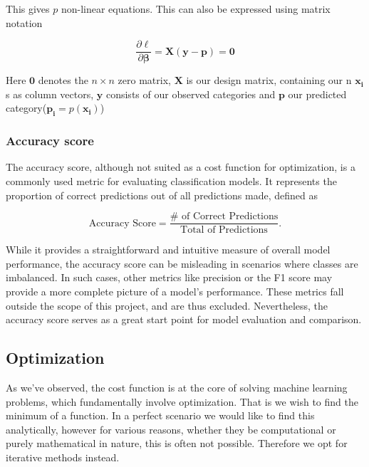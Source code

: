 \documentclass{article}
\theoremstyle{definition}
\begin{document}
This gives $p$ non-linear equations.
This can also be expressed using matrix notation

\[
\frac{\partial \ell }{\partial \boldsymbol{\beta}}  = \boldsymbol{X} (\boldsymbol{y} - \boldsymbol{p}) = \boldsymbol{0}
\]

Here $\boldsymbol{0}$ denotes the $n \times n$ zero matrix, $\mathbf{X}$ is our design matrix, containing our n $\boldsymbol{x_i}$s as column vectors, $\boldsymbol{y}$ consists of our observed categories and $\boldsymbol{p}$ our predicted category($\boldsymbol{p_i} = p(\boldsymbol{x_i})$)





\subsubsection{Accuracy score}

The accuracy score, although not suited as a cost function for optimization, is a commonly used metric for evaluating classification models. It represents the proportion of correct predictions out of all predictions made, defined as

\begin{equation*}
    \text{Accuracy Score} = \frac{ \# \text{ of Correct Predictions}}{\text{Total} \text{ of Predictions}}.
\end{equation*}

While it provides a straightforward and intuitive measure of overall model performance, the accuracy score can be misleading in scenarios where classes are imbalanced. In such cases, other metrics like precision or the F1 score may provide a more complete picture of a model's performance. These metrics fall outside the scope of this project, and are thus excluded. Nevertheless, the accuracy score serves as a great start point for model evaluation and comparison.

\subsection{Optimization}
As we've observed, the cost function is at the core of solving machine learning problems, which fundamentally involve optimization. That is we wish to find the minimum of a function. In a perfect scenario we would like to find this analytically, however for various reasons, whether they be computational or purely mathematical in nature, this is often not possible. Therefore we opt for iterative methods instead.
\end{document}
